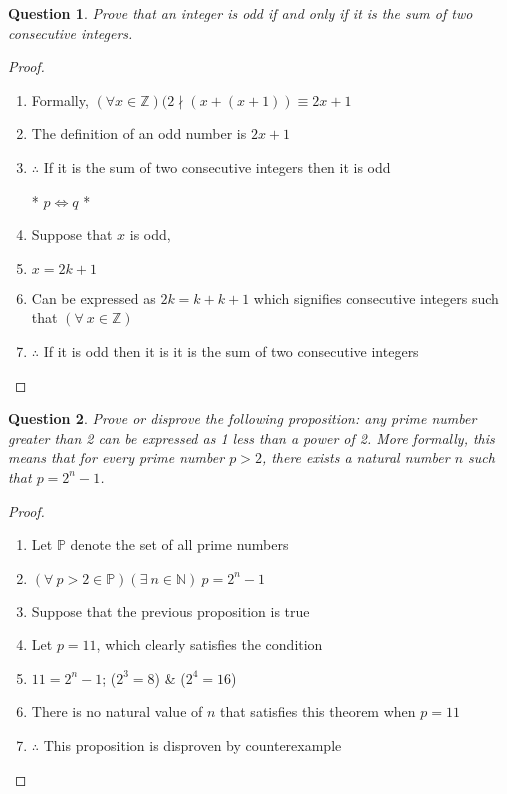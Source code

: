 \documentclass{article}
\newtheorem{question}{Question}
\begin{document}
\newpage

\begin{question}
    Prove that an integer is odd if and only if it is the sum of two consecutive integers.
\end{question}

\begin{proof}
    \begin{enumerate}
        \item Formally, $(\forall x \in \mathbb{Z})(2 \nmid (x + (x+1)) \equiv 2x + 1$
        \item The definition of an odd number is $2x + 1$
        \item $\therefore$ If it is the sum of two consecutive integers then it is odd \\
            \centerline{* \boldmath$p \Leftrightarrow q$ *}
        \item Suppose that $x$ is odd,
        \item $x = 2k + 1$
        \item Can be expressed as $2k = k + k + 1$ which signifies consecutive integers such that $(\forall \ x \in \mathbb{Z})$
        \item $\therefore$ If it is odd then it is it is the sum of two consecutive integers
    \end{enumerate}
\end{proof}

\bigskip

\begin{question}
    Prove or disprove the following proposition: any prime number greater than 2 can be expressed as 1 less than a power of 2. More formally, this means that for every prime number $p > 2$, there exists a natural number $n$ such that $p = 2^n - 1$.
\end{question}

\begin{proof}
    \begin{enumerate}
        \item Let $\mathbb{P}$ denote the set of all prime numbers
        \item $(\forall \ p > 2 \in \mathbb{P})(\exists \ n \in \mathbb{N})\ p = 2^n - 1$
        \item Suppose that the previous proposition is true
        \item Let $p = 11$, which clearly satisfies the condition
        \item $11 = 2^n - 1$; ($2^3 = 8$) \& ($2^4 = 16$)
        \item There is no natural value of $n$ that satisfies this theorem when $p=11$
        \item  $\therefore$ This proposition is disproven by counterexample
    \end{enumerate}
\end{proof}
\end{document}
